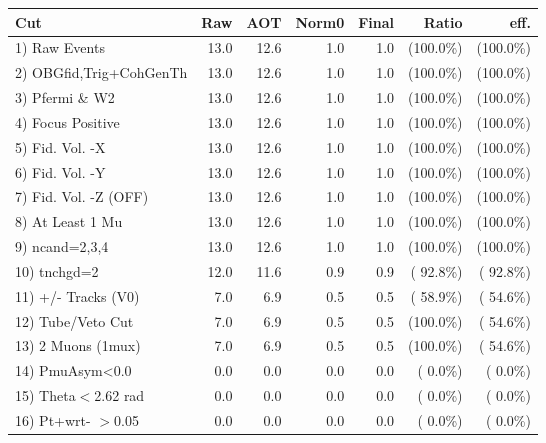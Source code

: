  \begin{table}[h!]\centering
 \begin{tabular}{||l||r|r|r|r|r|r||}
 \hline
 \hline
 Cut & Raw & AOT & Norm0 & Final & Ratio & eff.       \\
 \hline
  1) Raw Events           &         13.0 &         12.6 &          1.0 &          1.0 & (100.0\%) & (100.0\%) \\
  2) OBGfid,Trig+CohGenTh &         13.0 &         12.6 &          1.0 &          1.0 & (100.0\%) & (100.0\%) \\
  3) Pfermi \& W2         &         13.0 &         12.6 &          1.0 &          1.0 & (100.0\%) & (100.0\%) \\
  4) Focus Positive       &         13.0 &         12.6 &          1.0 &          1.0 & (100.0\%) & (100.0\%) \\
  5) Fid. Vol. -X         &         13.0 &         12.6 &          1.0 &          1.0 & (100.0\%) & (100.0\%) \\
  6) Fid. Vol. -Y         &         13.0 &         12.6 &          1.0 &          1.0 & (100.0\%) & (100.0\%) \\
  7) Fid. Vol. -Z (OFF)   &         13.0 &         12.6 &          1.0 &          1.0 & (100.0\%) & (100.0\%) \\
  8) At Least 1 Mu        &         13.0 &         12.6 &          1.0 &          1.0 & (100.0\%) & (100.0\%) \\
  9) ncand=2,3,4          &         13.0 &         12.6 &          1.0 &          1.0 & (100.0\%) & (100.0\%) \\
 10) tnchgd=2             &         12.0 &         11.6 &          0.9 &          0.9 & ( 92.8\%) & ( 92.8\%) \\
 11) +/- Tracks (V0)      &          7.0 &          6.9 &          0.5 &          0.5 & ( 58.9\%) & ( 54.6\%) \\
 12) Tube/Veto Cut        &          7.0 &          6.9 &          0.5 &          0.5 & (100.0\%) & ( 54.6\%) \\
 13) 2 Muons (1mux)       &          7.0 &          6.9 &          0.5 &          0.5 & (100.0\%) & ( 54.6\%) \\
 14) PmuAsym<0.0          &          0.0 &          0.0 &          0.0 &          0.0 & (  0.0\%) & (  0.0\%) \\
 15) Theta$<$2.62 rad     &          0.0 &          0.0 &          0.0 &          0.0 & (  0.0\%) & (  0.0\%) \\
 16) Pt+wrt- $>$0.05      &          0.0 &          0.0 &          0.0 &          0.0 & (  0.0\%) & (  0.0\%) \\

\end{tabular}
\end{table}

